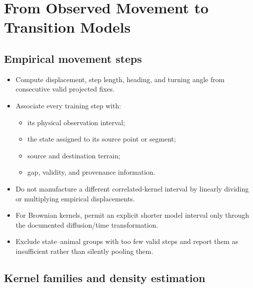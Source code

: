 \chapter{From Observed Movement to Transition Models}
\label{chap:kernels}

\section{Empirical movement steps}

\begin{itemize}
  \item Compute displacement, step length, heading, and turning angle from consecutive valid projected fixes.
  \item Associate every training step with:
  \begin{itemize}
    \item its physical observation interval;
    \item the state assigned to its source point or segment;
    \item source and destination terrain;
    \item gap, validity, and provenance information.
  \end{itemize}
  \item Do not manufacture a different correlated-kernel interval by linearly dividing or multiplying empirical displacements.
  \item For Brownian kernels, permit an explicit shorter model interval only through the documented diffusion/time transformation.
  \item Exclude state--animal groups with too few valid steps and report them as insufficient rather than silently pooling them.
\end{itemize}

\section{Kernel families and density estimation}

